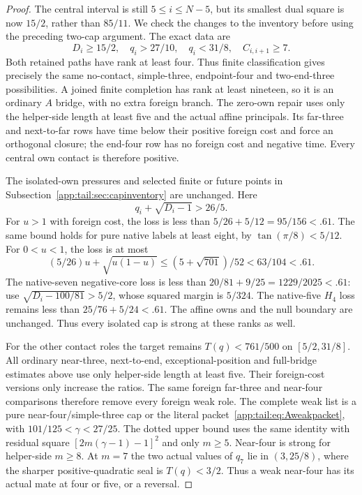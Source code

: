 \begin{proof}
The central interval is still $5\le i\le N-5$, but its smallest
dual square is now $15/2$, rather than $85/11$. We check the
changes to the inventory before using the preceding two-cap argument.
The exact data are
\[
 D_i\ge15/2,\quad q_i>27/10,\quad q_i<31/8,\quad
 C_{i,i+1}\ge7.
\]
Both retained paths have rank at least four. Thus finite classification
gives precisely the same no-contact, simple-three, endpoint-four and
two-end-three possibilities. A joined finite completion has rank at
least nineteen, so it is an ordinary $A$ bridge, with no extra foreign
branch. The zero-own repair uses only the helper-side length at least
five and the actual affine principals. Its far-three and next-to-far
rows have time below their positive foreign cost and force an
orthogonal closure; the end-four row has no foreign cost and negative
time. Every central own contact is therefore positive.

The isolated-own pressures and selected finite or future points in
Subsection~\ref{app:tail:sec:capinventory} are unchanged. Here
\[
 q_i+\sqrt{D_i-1}>26/5.
\]
For $u>1$ with foreign cost, the loss is less than
$5/26+5/12=95/156<.61$. The same bound holds for pure native
labels at least eight, by $\tan(\pi/8)<5/12$.
For $0<u<1$, the loss is at most
\[
 (5/26)u+\sqrt{u(1-u)}
 \le(5+\sqrt{701})/52<63/104<.61.
\]
The native-seven negative-core loss is less than
$20/81+9/25=1229/2025<.61$: use
$\sqrt{D_i-100/81}>5/2$, whose squared margin is $5/324$.
The native-five $H_4$ loss remains less than
$25/76+5/24<.61$. The affine owns and the null boundary are
unchanged. Thus every isolated cap is strong at these ranks as well.

For the other contact roles the target remains
$T(q)<761/500$ on $[5/2,31/8]$. All ordinary near-three,
next-to-end, exceptional-position and full-bridge estimates above
use only helper-side length at least five. Their foreign-cost
versions only increase the ratios. The same foreign far-three
and near-four comparisons therefore remove every foreign weak role.
The complete weak list is a pure near-four/simple-three cap or
the literal packet~\eqref{app:tail:eq:Aweakpacket}, with
$101/125<\gamma<27/25$. The dotted upper bound uses the
same identity with residual square
$[2m(\gamma-1)-1]^2$ and only $m\ge5$.
Near-four is strong for helper-side $m\ge8$. At $m=7$ the
two actual values of $q_7$ lie in $(3,25/8)$, where the
sharper positive-quadratic seal is $T(q)<3/2$. Thus a weak
near-four has its actual mate at four or five, or a reversal.


\end{proof}
